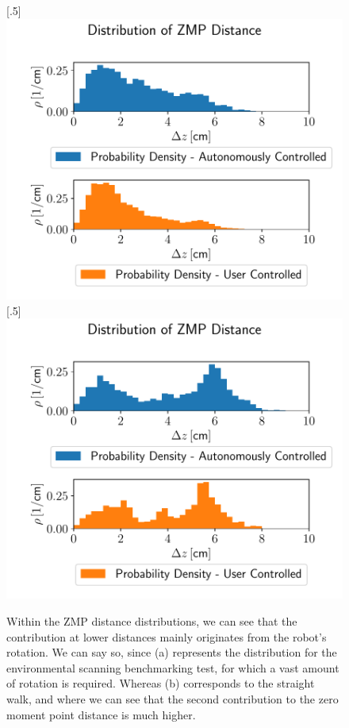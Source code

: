 \begin{figure}[h!] 
	[.5\linewidth]{\includegraphics[scale=.45]{chapters/04_experiments/02_autonomous_walking/zmp_distribution_sight.pdf}}
	[.5\linewidth]{\includegraphics[scale=.45]{chapters/04_experiments/02_autonomous_walking/zmp_distribution_straight.pdf}}
	\caption{Within the ZMP distance distributions, we can see that the contribution at lower distances mainly originates from the robot's rotation. We can say so, since (a) represents the distribution for the environmental scanning benchmarking test, for which a vast amount of rotation is required. Whereas (b) corresponds to the straight walk, and where we can see that the second contribution to the zero moment point distance is much higher.}
	\label{fig::424_aw_zmp_dist_split}
\end{figure} 
